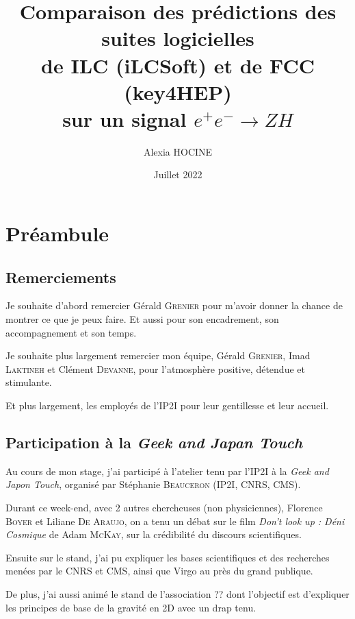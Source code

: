 \documentclass[10pt,a4paper]{report}
\author{Alexia \textsc{HOCINE}}
\title{Comparaison des prédictions des suites logicielles\\
	de ILC (iLCSoft) et de FCC (key4HEP) \\
	sur un signal $ e^{+} e^{-} \longrightarrow Z H $ 
}
\date{Juillet 2022}
\begin{document}
\maketitle


\chapter*{Préambule}

\section*{Remerciements}

Je souhaite d'abord remercier Gérald \textsc{Grenier} pour m'avoir donner la chance de montrer ce que je peux faire. Et aussi pour son encadrement, son accompagnement et son temps.

Je souhaite plus largement remercier mon équipe, Gérald \textsc{Grenier}, Imad \textsc{Laktineh} et Clément \textsc{Devanne}, pour l'atmosphère positive, détendue et stimulante.

Et plus largement, les employés de l'IP2I pour leur gentillesse et leur accueil.

\section*{Participation à la \textit{Geek and Japan Touch}}

Au cours de mon stage, j'ai participé à l'atelier tenu par l'IP2I à la \textit{Geek and Japon Touch}, organisé par Stéphanie \textsc{Beauceron} (IP2I, CNRS, CMS).

Durant ce week-end, avec 2 autres chercheuses (non physiciennes), Florence \textsc{Boyer} et Liliane \textsc{De Araujo}, on a tenu un débat sur le film \textit{Don't look up : Déni Cosmique} de Adam \textsc{McKay}, sur la crédibilité du discours scientifiques.

Ensuite sur le stand, j'ai pu expliquer les bases scientifiques et des recherches menées par le CNRS et CMS, ainsi que Virgo au près du grand publique. 

De plus, j'ai aussi animé le stand de l'association ?? dont l'objectif est d'expliquer les principes de base de la gravité en 2D avec un drap tenu.


\tableofcontents

\end{document}
